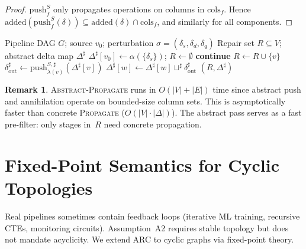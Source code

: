 \documentclass[11pt,a4paper]{article}
\theoremstyle{definition}
\newtheorem{remark}[theorem]{Remark}
\newcommand{\push}{\mathrm{push}}
\newcommand{\ann}{\mathrm{annihilates}}
\DeclareMathOperator{\succ}{succ}
\begin{document}
\begin{proof}
$\push_f^S$ only propagates operations on columns in $\mathrm{cols}_f$.
Hence $\mathrm{added}(\push_f^S(\delta)) \subseteq \mathrm{added}(\delta) \cap
\mathrm{cols}_f$, and similarly for all components.
\end{proof}

\begin{algorithm}[htbp]
\caption{\textsc{Abstract-Propagate}: Abstract Delta Propagation}
\label{alg:abstract-propagate}
\begin{algorithmic}[1]
\Require Pipeline DAG $G$; source $v_0$; perturbation $\sigma = (\delta_s, \delta_d, \delta_q)$
\Ensure Repair set $R \subseteq V$; abstract delta map $\Delta^\sharp$
\State $\Delta^\sharp[v_0] \gets \alpha(\{\delta_s\})$; $R \gets \emptyset$
  \If{$\ann^\sharp(\lambda(v), \Delta^\sharp[v])$}
    \State \textbf{continue} 
  \EndIf
  \State $R \gets R \cup \{v\}$
  \State $\delta_{\mathrm{out}}^\sharp \gets \push_{\lambda(v)}^{S,\sharp}(\Delta^\sharp[v])$
  \For{$w \in \succ(v)$}
    \State $\Delta^\sharp[w] \gets \Delta^\sharp[w] \sqcup^\sharp \delta_{\mathrm{out}}^\sharp$
  \EndFor
\EndFor
\State \Return $(R, \Delta^\sharp)$
\end{algorithmic}
\end{algorithm}

\begin{remark}
\textsc{Abstract-Propagate} runs in $O(|V| + |E|)$ time since abstract push and
annihilation operate on bounded-size column sets.  This is asymptotically faster
than concrete \textsc{Propagate} ($O(|V| \cdot |\Delta|)$).  The abstract pass
serves as a fast pre-filter: only stages in~$R$ need concrete propagation.
\end{remark}


\section{Fixed-Point Semantics for Cyclic Topologies}
\label{sec:fixedpoint}

Real pipelines sometimes contain feedback loops (iterative ML training,
recursive CTEs, monitoring circuits).  Assumption~A2 requires stable topology
but does not mandate acyclicity.  We extend ARC to cyclic graphs via fixed-point
theory.
\end{document}
